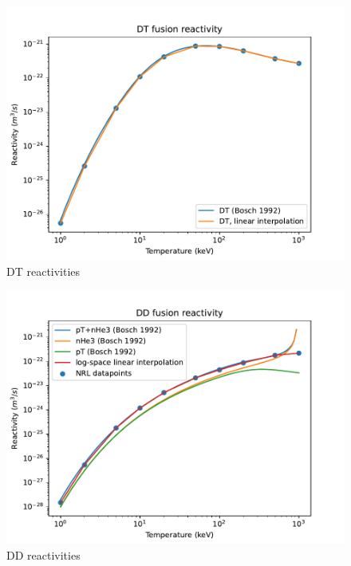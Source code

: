 \begin{figure}
    \centering
    \includegraphics[scale=0.7]{equation_figures/DT_reactivity.pdf}
    \caption{DT reactivities}
    \label{fig:DT_reac}
\end{figure}

\begin{figure}
    \centering
    \includegraphics[scale=0.7]{equation_figures/DD_reactivity.pdf}
    \caption{DD reactivities}
    \label{fig:DD_reac}
\end{figure}

